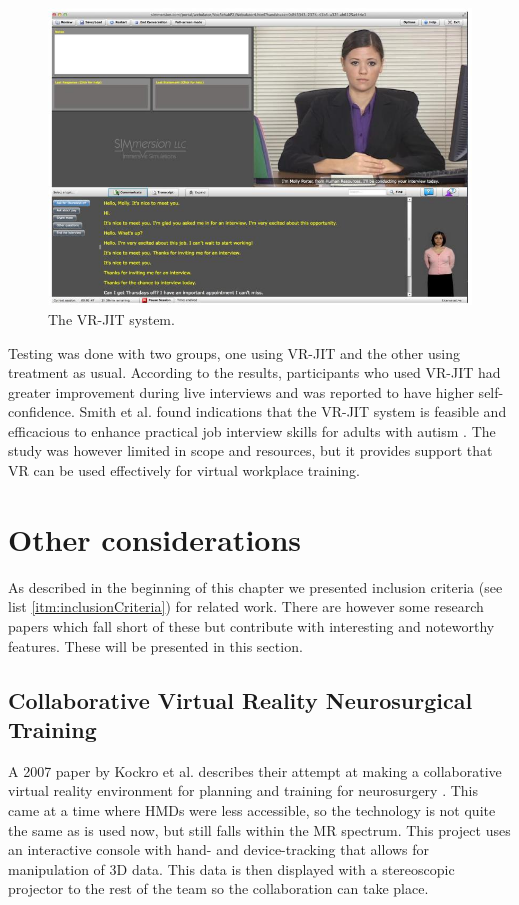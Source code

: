 \begin{figure}[!ht]
     \centering
     \includegraphics[width=.7\textwidth]{fig/related_work/vr-jit.jpg}
     \captionsetup{width=0.7\linewidth}
     \caption{The VR-JIT system.}
     \label{fig:vr-jit}
 \end{figure}
 
Testing was done with two groups, one using VR-JIT and the other using treatment as usual. According to the results, participants who used VR-JIT had greater improvement during live interviews and was reported to have higher self-confidence. Smith et al. found indications that the VR-JIT system is feasible and efficacious  to enhance practical job interview skills for adults with autism \cite{smith2014virtual}. The study was however limited in scope and resources, but it provides support that VR can be used effectively for virtual workplace training.  



\section{Other considerations}
As described in the beginning of this chapter  we presented inclusion criteria (see list \ref{itm:inclusionCriteria}) for related work. There are however some research papers which fall short of these but contribute with interesting and noteworthy features. These will be presented in this section.     

\subsection{Collaborative Virtual Reality Neurosurgical Training}
A 2007 paper by Kockro et al. describes their attempt at making a collaborative virtual reality environment for planning and training for neurosurgery \cite{kockro2007collaborative}. This came at a time where HMDs were less accessible, so the technology is not quite the same as is used now, but still falls within the MR spectrum. This project uses an interactive console with hand- and device-tracking that allows for manipulation of 3D data. This data is then displayed with a stereoscopic projector to the rest of the team so the collaboration can take place.

